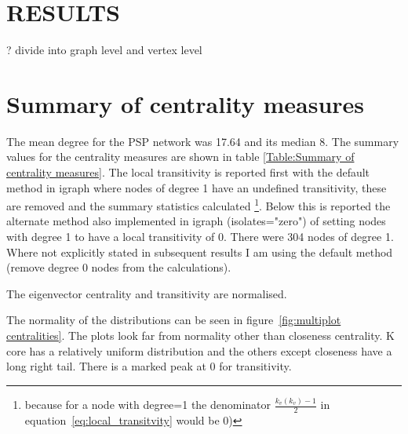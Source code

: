 










\section{RESULTS}
? divide into graph level and vertex level

\section{Summary of centrality measures}
The mean degree for the PSP network was 17.64 and its median 8.
The summary values for the centrality measures are shown in table \ref{Table:Summary of centrality measures}. The local transitivity is reported first with the default method in igraph where nodes of degree 1 have an undefined transitivity, these are removed and the summary statistics calculated \footnote{because for a node with degree=1 the denominator $\frac{k_v(k_v)-1}{2}$ in equation~\ref{eq:local_transitvity}  would be 0)}. Below this is reported the alternate method also implemented in igraph (isolates="zero") of setting nodes with degree 1 to have a local transitivity of 0. There were 304 nodes of degree 1. Where not explicitly stated in subsequent results I am using the default method (remove degree 0 nodes from the calculations).

The eigenvector centrality and transitivity are normalised. 

The normality of the distributions can be seen in figure~\ref{fig:multiplot centralities}. The plots look far from normality other than closeness centrality. K core has a relatively uniform distribution and the others except closeness have a long right tail. There is a marked peak at 0 for transitivity.

